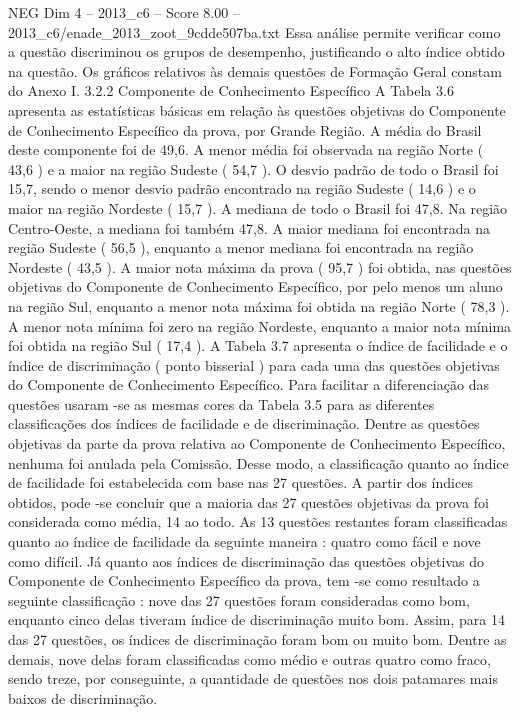 \begin{textsample}{NEG Dim 4 – 2013\_c6 – Score 8.00 – 2013\_c6/enade\_2013\_zoot\_9cdde507ba.txt}
Essa análise permite verificar como a questão discriminou os grupos de desempenho, justificando o alto índice obtido na questão.
Os gráficos relativos às demais questões de Formação Geral constam do Anexo I. 3.2.2 Componente de Conhecimento Específico A Tabela 3.6 apresenta as estatísticas básicas em relação às questões objetivas do Componente de Conhecimento Específico da prova, por Grande Região.
A média do Brasil deste componente foi de 49,6.
A menor média foi observada na região Norte ( 43,6 ) e a maior na região Sudeste ( 54,7 ).
O desvio padrão de todo o Brasil foi 15,7, sendo o menor desvio padrão encontrado na região Sudeste ( 14,6 ) e o maior na região Nordeste ( 15,7 ).
A mediana de todo o Brasil foi 47,8.
Na região Centro-Oeste, a mediana foi também 47,8.
A maior mediana foi encontrada na região Sudeste ( 56,5 ), enquanto a menor mediana foi encontrada na região Nordeste ( 43,5 ).
A maior nota máxima da prova ( 95,7 ) foi obtida, nas questões objetivas do Componente de Conhecimento Específico, por pelo menos um aluno na região Sul, enquanto a menor nota máxima foi obtida na região Norte ( 78,3 ).
A menor nota mínima foi zero na região Nordeste, enquanto a maior nota mínima foi obtida na região Sul ( 17,4 ).
A Tabela 3.7 apresenta o índice de facilidade e o índice de discriminação ( ponto bisserial ) para cada uma das questões objetivas do Componente de Conhecimento Específico.
Para facilitar a diferenciação das questões usaram -se as mesmas cores da Tabela 3.5 para as diferentes classificações dos índices de facilidade e de discriminação.
Dentre as questões objetivas da parte da prova relativa ao Componente de Conhecimento Específico, nenhuma foi anulada pela Comissão.
Desse modo, a classificação quanto ao índice de facilidade foi estabelecida com base nas 27 questões.
A partir dos índices obtidos, pode -se concluir que a maioria das 27 questões objetivas da prova foi considerada como média, 14 ao todo.
As 13 questões restantes foram classificadas quanto ao índice de facilidade da seguinte maneira : quatro como fácil e nove como difícil.
Já quanto aos índices de discriminação das questões objetivas do Componente de Conhecimento Específico da prova, tem -se como resultado a seguinte classificação : nove das 27 questões foram consideradas como bom, enquanto cinco delas tiveram índice de discriminação muito bom.
Assim, para 14 das 27 questões, os índices de discriminação foram bom ou muito bom.
Dentre as demais, nove delas foram classificadas como médio e outras quatro como fraco, sendo treze, por conseguinte, a quantidade de questões nos dois patamares mais baixos de discriminação.

\end{textsample}
